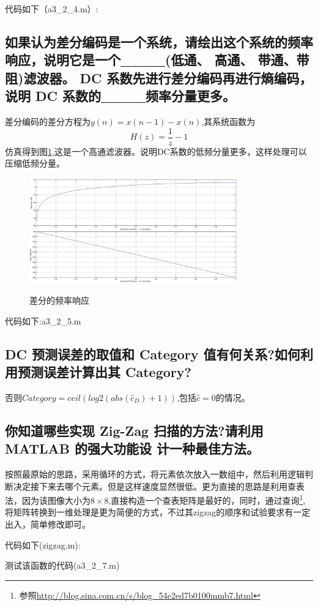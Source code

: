 \documentclass{ctexart}
\begin{document}
代码如下（a3\_2\_4.m）:

\subsection{
如果认为差分编码是一个系统，请绘出这个系统的频率响应，说明它是一个\_\_\_\_(低通、 高通、 带通、带阻)滤波器。 DC 系数先进行差分编码再进行熵编码，说明 DC 系数的\_\_\_\_频率分量更多。}
差分编码的差分方程为$y(n)=x(n-1)-x(n)$,其系统函数为\[H(z)=\frac{1}{z}-1\]仿真得到图\ref{a325},这是一个高通滤波器。说明DC系数的低频分量更多，这样处理可以压缩低频分量。
\begin{figure}
    \centering
    \includegraphics[width=0.8\textwidth]{pic/a3_2_5.jpg}\\
    \caption{差分的频率响应\label{a325}}
\end{figure}
代码如下:{a3\_2\_5.m}

\subsection{
DC 预测误差的取值和 Category 值有何关系?如何利用预测误差计算出其 Category?
}

否则$Category=ceil(log2(abs(\hat{c}_D)+1))$,包括$\hat{c}=0$的情况。

\subsection{
 你知道哪些实现 Zig-Zag 扫描的方法?请利用 MATLAB 的强大功能设
计一种最佳方法。
}
按照最原始的思路，采用循环的方式，将元素依次放入一数组中，然后利用逻辑判断决定接下来去哪个元素。但是这样速度显然很低。更为直接的思路是利用查表法，因为该图像大小为$8\times8$,直接构造一个查表矩阵是最好的，同时，通过查询\footnote{参照\url{http://blog.sina.com.cn/s/blog_54e2ed7b0100mmb7.html}},将矩阵转换到一维处理是更为简便的方式，不过其zigzag的顺序和试验要求有一定出入，简单修改即可。

代码如下(zigzag.m):

测试该函数的代码(a3\_2\_7.m)

\end{document}
